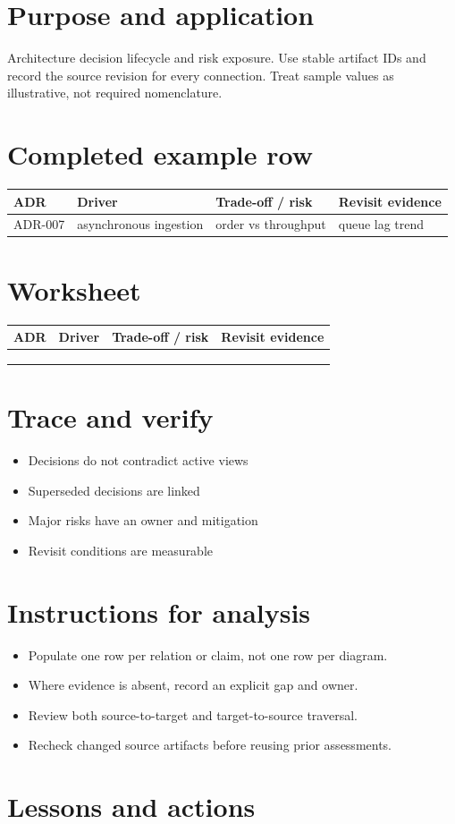 \documentclass[10pt,letterpaper]{article}
\begin{document}
\DocProvenance
\section{Purpose and application}
Architecture decision lifecycle and risk exposure. Use stable artifact IDs and record the source revision for every connection. Treat sample values as illustrative, not required nomenclature.

\section{Completed example row}
\small
\begin{tabularx}{\linewidth}{@{}YYYY@{}}
\toprule
\textbf{ADR} & \textbf{Driver} & \textbf{Trade-off / risk} & \textbf{Revisit evidence} \\
\midrule
ADR-007 & asynchronous ingestion & order vs throughput & queue lag trend \\
\bottomrule
\end{tabularx}
\normalsize
\section{Worksheet}
\small
\begin{tabularx}{\linewidth}{@{}YYYY@{}}
\toprule
\textbf{ADR} & \textbf{Driver} & \textbf{Trade-off / risk} & \textbf{Revisit evidence} \\
\midrule
 &  &  &  \\
 &  &  &  \\
 &  &  &  \\
\bottomrule
\end{tabularx}
\normalsize
\section{Trace and verify}
\begin{itemize}
\item Decisions do not contradict active views
\item Superseded decisions are linked
\item Major risks have an owner and mitigation
\item Revisit conditions are measurable
\end{itemize}
\section{Instructions for analysis}
\begin{itemize}
\item Populate one row per relation or claim, not one row per diagram.
\item Where evidence is absent, record an explicit gap and owner.
\item Review both source-to-target and target-to-source traversal.
\item Recheck changed source artifacts before reusing prior assessments.
\end{itemize}
\section{Lessons and actions}
\end{document}
